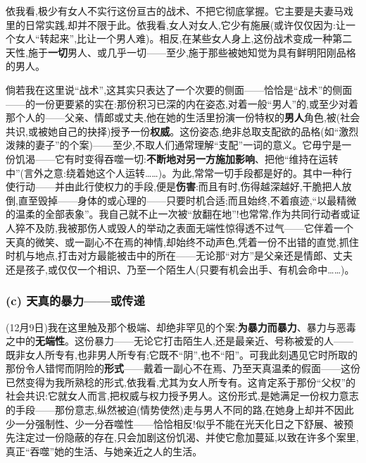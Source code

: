 依我看,极少有女人不实行这份亘古的战术、不把它彻底掌握。它主要是夫妻马戏里的日常实践,却并不限于此。依我看,女人对女人,它少有施展(或许仅仅因为:让一个女人“转起来”,比让一个男人难)。相反,在某些女人身上,这份战术变成一种第二天性,施于\textbf{一切}男人、或几乎一切——至少,施于那些被她知觉为具有鲜明阳刚品格的男人。

倘若我在这里说“战术”,这其实只表达了一个次要的侧面——恰恰是“战术”的侧面——的一份更要紧的实在:那份积习已深的内在姿态,对着一般“男人”的,或至少对着那个人的——父亲、情郎或丈夫,他在她的生活里扮演一份特权的\textbf{男人}角色,被(社会共识,或被她自己的抉择)授予一份\textbf{权威}。这份姿态,绝非总取支配欲的品格(如“激烈泼辣的妻子”的个案)——至少,不取人们通常理解“支配”一词的意义。它毋宁是一份饥渴——它有时变得吞噬一切:\textbf{不断地对另一方施加影响}\dmark{}、把他“维持在运转中”(言外之意:绕着她这个人运转……)。为此,常常一切手段都是好的。其中一种行使行动——并由此行使权力的手段,便是\textbf{伤害}:而且有时,伤得越深越好,干脆把人放倒,直至毁掉——身体的或心理的——只要时机合适;而且始终,不着痕迹,“以最精微的温柔的全部表象”。我自己就不止一次被“放翻在地”!也常常,作为共同行动者或证人猝不及防,我被那伤人或毁人的举动之表面无端性惊得透不过气——它伴着一个天真的微笑、或一副心不在焉的神情,却始终不动声色,凭着一份不出错的直觉,抓住时机与地点,打击对方最能被击中的所在——无论那“对方”是父亲还是情郎、丈夫还是孩子,或仅仅一个相识、乃至一个陌生人(只要有机会出手、有机会命中……)。

\subsubsection*{(c) 天真的暴力——或传递}
\label{ch18:local:h51}

\label{ch18:local:n47}

(12月9日)我在这里触及那个极端、却绝非罕见的个案:\textbf{为暴力而暴力}、暴力与恶毒之中的\textbf{无端性}。这份暴力——无论它打击陌生人,还是最亲近、号称被爱的人——既非女人所专有,也非男人所专有;它既不“阴”,也不“阳”。可我此刻遇见它时所取的那份令人错愕而阴险的\textbf{形式}——戴着一副心不在焉、乃至天真温柔的假面——这份已然变得为我所熟稔的形式,依我看,尤其为女人所专有。这肯定系于那份“父权”的社会共识:它就女人而言,把权威与权力授予男人\dmark{}。这份形式,是她满足一份权力意志的手段——那份意志,纵然被迫(情势使然)走与男人不同的路,在她身上却并不因此少一分强制性、少一分吞噬性——恰恰相反!似乎不能在光天化日之下舒展、被预先注定过一份隐蔽的存在,只会加剧这份饥渴、并使它愈加蔓延,以致在许多个案里,真正“吞噬”她的生活、与她亲近之人的生活。

